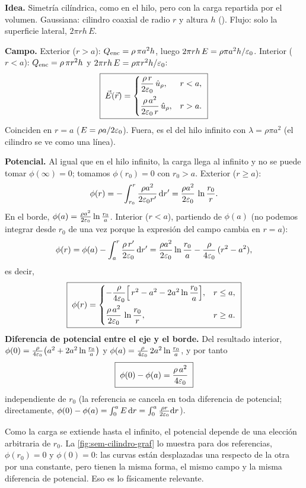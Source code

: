 \begin{resolucion}
\textbf{Idea.} Simetría cilíndrica, como en el hilo, pero con la carga repartida por el volumen. Gaussiana: cilindro coaxial de radio $r$ y altura $h$ (). Flujo: solo la superficie lateral, $2\pi r h\,E$.

\textbf{Campo.} Exterior ($r>a$): $Q_{\mathrm{enc}}=\rho\,\pi a^{2}h$, luego $2\pi rh\,E=\rho\pi a^{2}h/\varepsilon_{0}$. Interior ($r<a$): $Q_{\mathrm{enc}}=\rho\,\pi r^{2}h$ y $2\pi rh\,E=\rho\pi r^{2}h/\varepsilon_{0}$:
\[
  \boxed{\;\vec{E}(\vec{r})=\begin{cases}\dfrac{\rho\,r}{2\varepsilon_{0}}\,\hat{u}_{\rho},&r<a,\\[8pt]\dfrac{\rho\,a^{2}}{2\varepsilon_{0}\,r}\,\hat{u}_{\rho},&r>a.\end{cases}\;}
\]
Coinciden en $r=a$ ($E=\rho a/2\varepsilon_{0}$). Fuera, es el del hilo infinito con $\lambda=\rho\pi a^{2}$ (el cilindro se ve como una línea).

\textbf{Potencial.} Al igual que en el hilo infinito, la carga llega al infinito y no se puede tomar $\phi(\infty)=0$; tomamos $\phi(r_0)=0$ con $r_0>a$. Exterior ($r\ge a$):
\[
  \phi(r)=-\int_{r_0}^{r}\frac{\rho a^{2}}{2\varepsilon_{0} r'}\,\mathrm{d} r'=\frac{\rho a^{2}}{2\varepsilon_{0}}\,\ln\frac{r_0}{r}.
\]
En el borde, $\phi(a)=\frac{\rho a^{2}}{2\varepsilon_{0}}\ln\frac{r_0}{a}$. Interior ($r<a$), partiendo de $\phi(a)$ (no podemos integrar desde $r_0$ de una vez porque la expresión del campo cambia en $r=a$):
\[
  \phi(r)=\phi(a)-\int_{a}^{r}\frac{\rho\,r'}{2\varepsilon_{0}}\,\mathrm{d} r'=\frac{\rho a^{2}}{2\varepsilon_{0}}\ln\frac{r_0}{a}-\frac{\rho}{4\varepsilon_{0}}\,(r^{2}-a^{2}),
\]
es decir,
\[
  \boxed{\;\phi(r)=\begin{cases}-\dfrac{\rho}{4\varepsilon_{0}}\Bigl[\,r^{2}-a^{2}-2a^{2}\ln\dfrac{r_0}{a}\Bigr],&r\le a,\\[8pt]\dfrac{\rho\,a^{2}}{2\varepsilon_{0}}\,\ln\dfrac{r_0}{r},&r\ge a.\end{cases}\;}
\]
\textbf{Diferencia de potencial entre el eje y el borde.} Del resultado interior, $\phi(0)=\frac{\rho}{4\varepsilon_{0}}\bigl(a^{2}+2a^{2}\ln\frac{r_0}{a}\bigr)$ y $\phi(a)=\frac{\rho}{4\varepsilon_{0}}\,2a^{2}\ln\frac{r_0}{a}$, y por tanto
\[
  \boxed{\;\phi(0)-\phi(a)=\frac{\rho\,a^{2}}{4\varepsilon_{0}}\;}
\]
independiente de $r_0$ (la referencia se cancela en toda diferencia de potencial; directamente, $\phi(0)-\phi(a)=\int_0^a E\,\mathrm{d} r=\int_0^a\frac{\rho r}{2\varepsilon_{0}}\mathrm{d} r$).
\end{resolucion}

\begin{observacion}
Como la carga se extiende hasta el infinito, el potencial depende de una elección arbitraria de $r_0$. La \cref{fig:sem-cilindro-graf} lo muestra para dos referencias, $\phi(r_0)=0$ y $\phi(0)=0$: las curvas están desplazadas una respecto de la otra por una constante, pero tienen la misma forma, el mismo campo y la misma diferencia de potencial. Eso es lo físicamente relevante.
\end{observacion}

